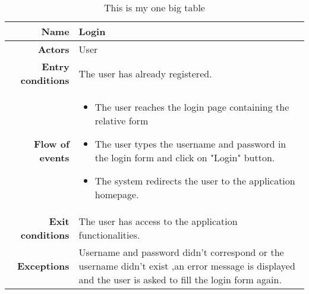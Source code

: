 \begin{table}[htp]

\begin{tabular}{r|p{7cm}}
\bf\large Name&\bf\large Login\\
\hline
\hline
\bf Actors&User\\
\hline
\bf Entry conditions&The user has already registered.\\
\hline
\bf Flow of events&
\begin{itemize}
\item The user reaches the login page containing the relative form
\item The user types the username and password in the login form and click on "Login" button.
\item The system redirects the user to the application homepage.
\end{itemize}
\\
\hline
\bf Exit conditions&The user has access to the application functionalities. \\
\hline
\bf Exceptions&Username and password didn't correspond or the username didn't exist ,an error message is displayed and the user is asked to fill the login form again.\\
\hline

\end{tabular}

\caption{This is my one big table } \label{tab:login}
\end{table}